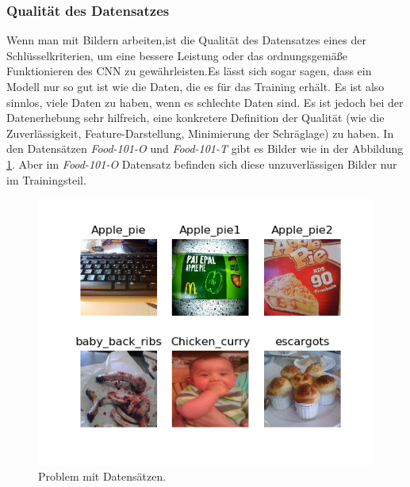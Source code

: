 \documentclass[12pt,a4paper]{scrartcl}
\numberwithin{equation}{section}
\begin{document}
\subsubsection{Qualität des Datensatzes}
	Wenn man mit Bildern arbeiten,ist die Qualität des Datensatzes eines der Schlüsselkriterien, um eine bessere Leistung oder das ordnungsgemäße Funktionieren des CNN zu gewährleisten.Es lässt sich sogar sagen, dass ein Modell nur so gut ist wie die Daten, die es für das Training erhält. Es ist also sinnlos, viele Daten zu haben, wenn es schlechte Daten sind. Es ist jedoch bei der Datenerhebung sehr hilfreich, eine konkretere Definition der Qualität (wie die Zuverlässigkeit, Feature-Darstellung, Minimierung der Schräglage) zu haben. In den Datensätzen \textit{Food-101-O } und \textit{Food-101-T} gibt es Bilder wie in der Abbildung  \ref{fig:Dataset_problem}. Aber im \textit{Food-101-O} Datensatz befinden sich diese unzuverlässigen Bilder nur im Trainingsteil.
\begin{figure}[h!]
	\centering
	\includegraphics[width=\textwidth]{Dataset_problem}
	\caption{Problem mit Datensätzen.}
	\label{fig:Dataset_problem}
\end{figure}
\end{document}

